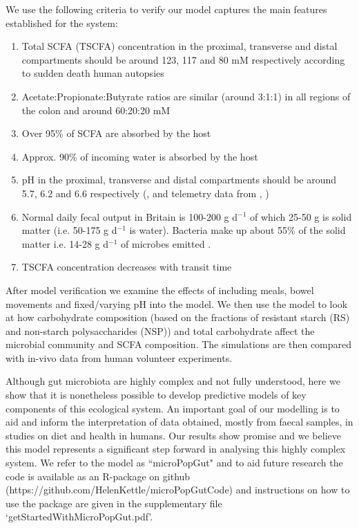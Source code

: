 \documentclass[a4paper]{article}
\begin{document}
We use the following criteria to verify our model captures the main features established for the system:
\begin{enumerate}
\item Total SCFA (TSCFA) concentration in the proximal, transverse and distal compartments should be around 123, 117 and 80 mM respectively according to sudden death human autopsies \citep{cummings} 
\item Acetate:Propionate:Butyrate ratios are similar (around 3:1:1) in all regions of the colon and around 60:20:20 mM \citep{cummings}
\item Over 95\% of SCFA are absorbed by the host \citep{Topping}
\item Approx. 90\% of incoming water is absorbed by the host \citep{Phillips} 
\item pH in the proximal, transverse and distal compartments should be around 5.7, 6.2 and 6.6 respectively (\cite{cummings}, and telemetry data from \cite{miko}, \cite{bown1974})
\item Normal daily fecal output in Britain is 100-200 g d$^{-1}$ of which 25-50 g is solid matter (i.e. 50-175 g d$^{-1}$ is water). Bacteria make up about 55\% of the solid matter i.e. 14-28 g d$^{-1}$ of microbes emitted \citep{StephenCummings}.
\item TSCFA concentration decreases with transit time \citep{Lewis}
\end{enumerate}
After model verification we examine the effects of including meals, bowel movements and fixed/varying pH into the model. We then use the model to look at how carbohydrate composition (based on the fractions of resistant starch (RS) and non-starch polysaccharides (NSP)) and total carbohydrate affect the microbial community and SCFA composition. The simulations are then compared with in-vivo data from human volunteer experiments. 

Although gut microbiota are highly complex and not fully understood, here we show that it is nonetheless possible to develop predictive models of key components of this ecological system. 
An important goal of our modelling is to aid and inform the interpretation of data obtained, mostly from faecal samples, in studies on diet and health in humans.
Our results show promise and we believe this model represents a significant step forward in analysing this highly complex system. 
We refer to the model as ``microPopGut" and to aid future research the code is available as an R-package on github (https://github.com/HelenKettle/microPopGutCode) and instructions on how to use the package are given in the supplementary file `getStartedWithMicroPopGut.pdf'.
\end{document}
